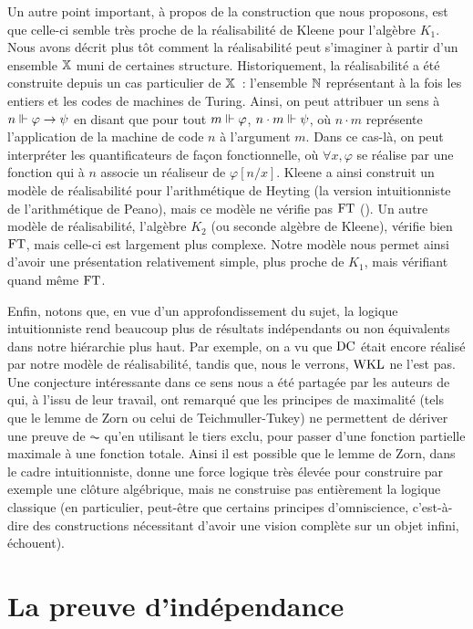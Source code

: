 \documentclass{article}
\begin{document}
Un autre point important, à propos de la construction que nous proposons, est que celle-ci semble très proche de la réalisabilité de Kleene pour l'algèbre $K_1$. Nous avons décrit plus tôt comment la réalisabilité peut s'imaginer à partir d'un ensemble $\mathbb X$ muni de certaines structure. Historiquement, la réalisabilité a été construite depuis un cas particulier de $\mathbb X$~: l'ensemble $\mathbb{N}$ représentant à la fois les entiers et les codes de machines de Turing. Ainsi, on peut attribuer un sens à $n\Vdash \varphi \to \psi$ en disant que pour tout $m\Vdash \varphi$, $n\cdot m \Vdash\psi$, où $n\cdot m$ représente l'application de la machine de code $n$ à l'argument $m$. Dans ce cas-là, on peut interpréter les quantificateurs de façon fonctionnelle, où $\forall x, \varphi$ se réalise par une fonction qui à $n$ associe un réaliseur de $\varphi[n/x]$. Kleene a ainsi construit un modèle de réalisabilité pour l'arithmétique de Heyting (la version intuitionniste de l'arithmétique de Peano), mais ce modèle ne vérifie pas $\mathrm{FT}$ (\cite{Kleene1965-KLETFO-3}). Un autre modèle de réalisabilité, l'algèbre $K_2$ (ou seconde algèbre de Kleene), vérifie bien $\mathrm{FT}$, mais celle-ci est largement plus complexe. Notre modèle nous permet ainsi d'avoir une présentation relativement simple, plus proche de $K_1$, mais vérifiant quand même $\mathrm{FT}$.

Enfin, notons que, en vue d'un approfondissement du sujet, la logique intuitionniste rend beaucoup plus de résultats indépendants ou non équivalents dans notre hiérarchie plus haut. Par exemple, on a vu que $\mathrm{DC}$ était encore réalisé par notre modèle de réalisabilité, tandis que, nous le verrons, $\mathrm{WKL}$ ne l'est pas. Une conjecture intéressante dans ce sens nous a été partagée par les auteurs de \cite{DBLP:conf/fscd/HerbelinK24} qui, à l'issu de leur travail, ont remarqué que les principes de maximalité (tels que le lemme de Zorn ou celui de Teichmuller-Tukey) ne permettent de dériver une preuve de $\AC$ qu'en utilisant le tiers exclu, pour passer d'une fonction partielle maximale à une fonction totale. Ainsi il est possible que le lemme de Zorn, dans le cadre intuitionniste, donne une force logique très élevée pour construire par exemple une clôture algébrique, mais ne construise pas entièrement la logique classique (en particulier, peut-être que certains principes d'omniscience, c'est-à-dire des constructions nécessitant d'avoir une vision complète sur un objet infini, échouent).

\section{La preuve d'indépendance}
\end{document}
